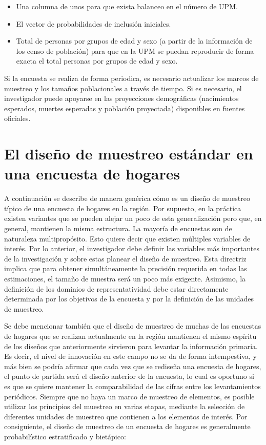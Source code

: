 \documentclass[
  10pt,
  spanish,
]{book}
\providecommand{\tightlist}{%
  \setlength{\itemsep}{0pt}\setlength{\parskip}{0pt}}
\begin{document}
\begin{itemize}
\tightlist
\item
  Una columna de unos para que exista balanceo en el número de UPM.
\item
  El vector de probabilidades de inclusión iniciales.
\item
  Total de personas por grupos de edad y sexo (a partir de la información de los censo de población) para que en la UPM se puedan reproducir de forma exacta el total personas por grupos de edad y sexo.
\end{itemize}

Si la encuesta se realiza de forma periodica, es necesario actualizar los marcos de muestreo y los tamaños poblacionales a través de tiempo. Si es necesario, el investigador puede apoyarse en las proyecciones demográficas (nacimientos esperados, muertes esperadas y población proyectada) disponibles en fuentes oficiales.

\hypertarget{el-diseuxf1o-de-muestreo-estuxe1ndar-en-una-encuesta-de-hogares}{%
\section{El diseño de muestreo estándar en una encuesta de hogares}\label{el-diseuxf1o-de-muestreo-estuxe1ndar-en-una-encuesta-de-hogares}}

A continuación se describe de manera genérica cómo es un diseño de muestreo típico de una encuesta de hogares en la región. Por supuesto, en la práctica existen variantes que se pueden alejar un poco de esta generalización pero que, en general, mantienen la misma estructura. La mayoría de encuestas son de naturaleza multipropósito. Esto quiere decir que existen múltiples variables de interés. Por lo anterior, el investigador debe definir las variables más importantes de la investigación y sobre estas planear el diseño de muestreo. Esta directriz implica que para obtener simultáneamente la precisión requerida en todas las estimaciones, el tamaño de muestra será un poco más exigente. Asimismo, la definición de los dominios de representatividad debe estar directamente determinada por los objetivos de la encuesta y por la definición de las unidades de muestreo.

Se debe mencionar también que el diseño de muestreo de muchas de las encuestas de hogares que se realizan actualmente en la región mantienen el mismo espíritu de los diseños que anteriormente sirvieron para levantar la información primaria. Es decir, el nivel de innovación en este campo no se da de forma intempestiva, y más bien se podría afirmar que cada vez que se rediseña una encuesta de hogares, el punto de partida será el diseño anterior de la encuesta, lo cual es oportuno si es que se quiere mantener la comparabilidad de las cifras entre los levantamientos periódicos. Siempre que no haya un marco de muestreo de elementos, es posible utilizar los principios del muestreo en varias etapas, mediante la selección de diferentes unidades de muestreo que contienen a los elementos de interés. Por consiguiente, el diseño de muestreo de un encuesta de hogares es generalmente probabilístico estratificado y bietápico:
\end{document}
